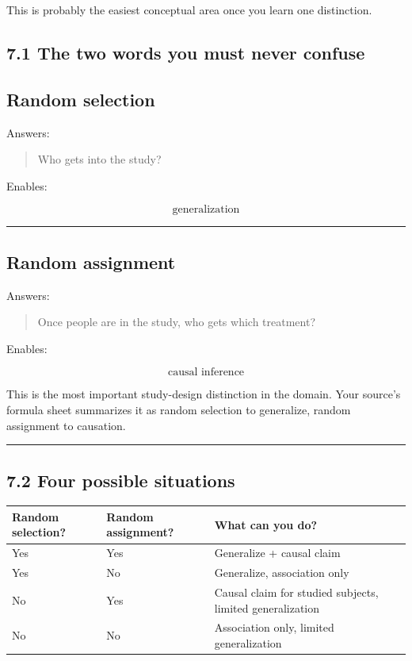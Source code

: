 \documentclass[
]{article}
\newcounter{none} %
\begin{document}
This is probably the easiest conceptual area once you learn one
distinction.

\subsection{7.1 The two words you must never
confuse}\label{the-two-words-you-must-never-confuse}

\subsection{Random selection}\label{random-selection}

Answers:

\begin{quote}
Who gets into the study?
\end{quote}

Enables:

\[
\boxed{\text{generalization}}
\]

\begin{center}\rule{0.5\linewidth}{0.5pt}\end{center}

\subsection{Random assignment}\label{random-assignment}

Answers:

\begin{quote}
Once people are in the study, who gets which treatment?
\end{quote}

Enables:

\[
\boxed{\text{causal inference}}
\]

This is the most important study-design distinction in the domain. Your
source's formula sheet summarizes it as random selection to generalize,
random assignment to causation.

\begin{center}\rule{0.5\linewidth}{0.5pt}\end{center}

\subsection{7.2 Four possible
situations}\label{four-possible-situations}

{\def\LTcaptype{none} %
\begin{longtable}[]{@{}lll@{}}
\toprule\noalign{}
Random selection? & Random assignment? & What can you do? \\
\midrule\noalign{}
\endhead
\bottomrule\noalign{}
\endlastfoot
Yes & Yes & Generalize + causal claim \\
Yes & No & Generalize, association only \\
No & Yes & Causal claim for studied subjects, limited generalization \\
No & No & Association only, limited generalization \\
\end{longtable}
}
\end{document}
